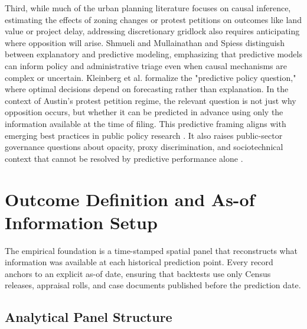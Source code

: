 \documentclass[11pt, letterpaper]{article}
\begin{document}
Third, while much of the urban planning literature focuses on causal inference, estimating the effects of zoning changes or protest petitions on outcomes like land value or project delay, addressing discretionary gridlock also requires anticipating where opposition will arise. Shmueli \cite{shmueli2010} and Mullainathan and Spiess \cite{mullainathan2017ml} distinguish between explanatory and predictive modeling, emphasizing that predictive models can inform policy and administrative triage even when causal mechanisms are complex or uncertain. Kleinberg et al. \cite{kleinberg2015prediction} formalize the "predictive policy question," where optimal decisions depend on forecasting rather than explanation. In the context of Austin's protest petition regime, the relevant question is not just why opposition occurs, but whether it can be predicted in advance using only the information available at the time of filing. This predictive framing aligns with emerging best practices in public policy research \cite{athey2019ml}. It also raises public-sector governance questions about opacity, proxy discrimination, and sociotechnical context that cannot be resolved by predictive performance alone \cite{eubanks2018,oneil2016weapons,barocas2016,selbst2019fairness}.

\section{Outcome Definition and As-of Information Setup}

The empirical foundation is a time-stamped spatial panel that reconstructs what information was available at each historical prediction point. Every record anchors to an explicit as-of date, ensuring that backtests use only Census releases, appraisal rolls, and case documents published before the prediction date.

\subsection{Analytical Panel Structure}
\end{document}
